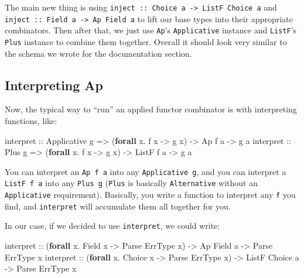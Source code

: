 \documentclass[]{article}
\newenvironment{Shaded}{}{}
\newcommand{\DataTypeTok}[1]{\textcolor[rgb]{0.56,0.13,0.00}{#1}}
\newcommand{\KeywordTok}[1]{\textcolor[rgb]{0.00,0.44,0.13}{\textbf{#1}}}
\newcommand{\NormalTok}[1]{#1}
\newcommand{\OperatorTok}[1]{\textcolor[rgb]{0.40,0.40,0.40}{#1}}
\newcommand{\OtherTok}[1]{\textcolor[rgb]{0.00,0.44,0.13}{#1}}
\begin{document}
The main new thing is using
\texttt{inject\ ::\ Choice\ a\ -\textgreater{}\ ListF\ Choice\ a} and
\texttt{inject\ ::\ Field\ a\ -\textgreater{}\ Ap\ Field\ a} to lift our base
types into their appropriate combinators. Then after that, we just use
\texttt{Ap}'s \texttt{Applicative} instance and \texttt{ListF}'s \texttt{Plus}
instance to combine them together. Overall it should look very similar to the
schema we wrote for the documentation section.

\hypertarget{interpreting-ap}{%
\subsection{Interpreting Ap}\label{interpreting-ap}}

Now, the typical way to ``run'' an applied functor combinator is with
interpreting functions, like:

\begin{Shaded}
\begin{Highlighting}[]
\OtherTok{interpret ::} \DataTypeTok{Applicative}\NormalTok{ g }\OtherTok{=>}\NormalTok{ (}\KeywordTok{forall}\NormalTok{ x}\OperatorTok{.}\NormalTok{ f x }\OtherTok{{-}>}\NormalTok{ g x) }\OtherTok{{-}>} \DataTypeTok{Ap}\NormalTok{ f a    }\OtherTok{{-}>}\NormalTok{ g a}
\OtherTok{interpret ::} \DataTypeTok{Plus}\NormalTok{ g        }\OtherTok{=>}\NormalTok{ (}\KeywordTok{forall}\NormalTok{ x}\OperatorTok{.}\NormalTok{ f x }\OtherTok{{-}>}\NormalTok{ g x) }\OtherTok{{-}>} \DataTypeTok{ListF}\NormalTok{ f a }\OtherTok{{-}>}\NormalTok{ g a}
\end{Highlighting}
\end{Shaded}

You can interpret an \texttt{Ap\ f\ a} into any \texttt{Applicative\ g}, and you
can interpret a \texttt{ListF\ f\ a} into any \texttt{Plus\ g} (\texttt{Plus} is
basically \texttt{Alternative} without an \texttt{Applicative} requirement).
Basically, you write a function to interpret any \texttt{f} you find, and
\texttt{interpret} will accumulate them all together for you.

In our case, if we decided to use \texttt{interpret}, we could write:

\begin{Shaded}
\begin{Highlighting}[]
\OtherTok{interpret ::}\NormalTok{ (}\KeywordTok{forall}\NormalTok{ x}\OperatorTok{.} \DataTypeTok{Field}\NormalTok{  x }\OtherTok{{-}>} \DataTypeTok{Parse} \DataTypeTok{ErrType}\NormalTok{ x) }\OtherTok{{-}>} \DataTypeTok{Ap}    \DataTypeTok{Field}\NormalTok{  a }\OtherTok{{-}>} \DataTypeTok{Parse} \DataTypeTok{ErrType}\NormalTok{ x}
\OtherTok{interpret ::}\NormalTok{ (}\KeywordTok{forall}\NormalTok{ x}\OperatorTok{.} \DataTypeTok{Choice}\NormalTok{ x }\OtherTok{{-}>} \DataTypeTok{Parse} \DataTypeTok{ErrType}\NormalTok{ x) }\OtherTok{{-}>} \DataTypeTok{ListF} \DataTypeTok{Choice}\NormalTok{ a }\OtherTok{{-}>} \DataTypeTok{Parse} \DataTypeTok{ErrType}\NormalTok{ x}
\end{Highlighting}
\end{Shaded}
\end{document}
